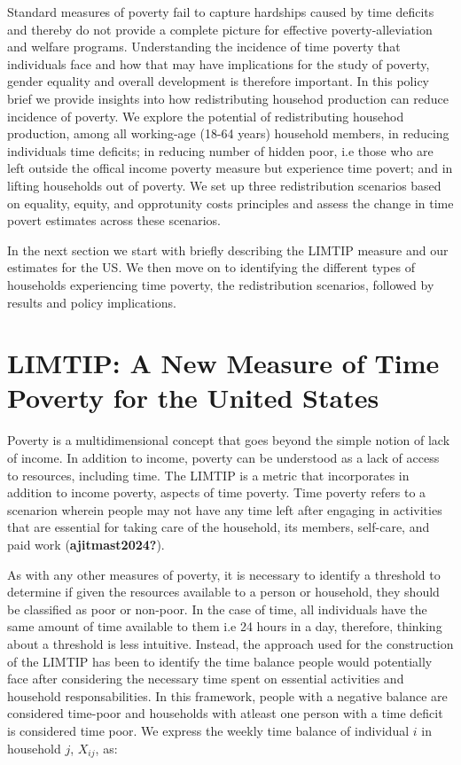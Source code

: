 \documentclass[
  11pt,
]{article}
\begin{document}
Standard measures of poverty fail to capture hardships caused by time
deficits and thereby do not provide a complete picture for effective
poverty-alleviation and welfare programs. Understanding the incidence of
time poverty that individuals face and how that may have implications
for the study of poverty, gender equality and overall development is
therefore important. In this policy brief we provide insights into how
redistributing househod production can reduce incidence of poverty. We
explore the potential of redistributing househod production, among all
working-age (18-64 years) household members, in reducing individuals
time deficits; in reducing number of hidden poor, i.e those who are left
outside the offical income poverty measure but experience time povert;
and in lifting households out of poverty. We set up three redistribution
scenarios based on equality, equity, and opprotunity costs principles
and assess the change in time povert estimates across these scenarios.

In the next section we start with briefly describing the LIMTIP measure
and our estimates for the US. We then move on to identifying the
different types of households experiencing time poverty, the
redistribution scenarios, followed by results and policy implications.

\section{LIMTIP: A New Measure of Time Poverty for the United
States}\label{limtip-a-new-measure-of-time-poverty-for-the-united-states}

Poverty is a multidimensional concept that goes beyond the simple notion
of lack of income. In addition to income, poverty can be understood as a
lack of access to resources, including time. The LIMTIP is a metric that
incorporates in addition to income poverty, aspects of time poverty.
Time poverty refers to a scenarion wherein people may not have any time
left after engaging in activities that are essential for taking care of
the household, its members, self-care, and paid work
(\textbf{ajitmast2024?}).

As with any other measures of poverty, it is necessary to identify a
threshold to determine if given the resources available to a person or
household, they should be classified as poor or non-poor. In the case of
time, all individuals have the same amount of time available to them i.e
24 hours in a day, therefore, thinking about a threshold is less
intuitive. Instead, the approach used for the construction of the LIMTIP
has been to identify the time balance people would potentially face
after considering the necessary time spent on essential activities and
household responsabilities. In this framework, people with a negative
balance are considered time-poor and households with atleast one person
with a time deficit is considered time poor. We express the weekly time
balance of individual \(i\) in household \(j\), \(X_{ij}\), as:
\end{document}
